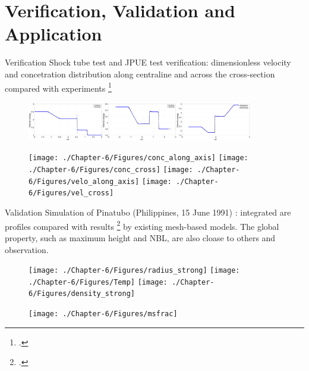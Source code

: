 \documentclass{beamer}
\begin{document}
\section{Verification, Validation and Application}
\begin{frame}{Verification}
Shock tube test and JPUE test verification: dimensionless velocity and concetration distribution along centraline and across the cross-section compared with experiments \footcite{papanicolaou1988investigations}
\begin{figure}
    \centering
	  \includegraphics[width=0.88\textwidth]{./PPT/Fig6} 
\end{figure}
\begin{figure}
\texttt{[image: ./Chapter-6/Figures/conc\_along\_axis]}
\hfill
\texttt{[image: ./Chapter-6/Figures/conc\_cross]}
\hfill
\texttt{[image: ./Chapter-6/Figures/velo\_along\_axis]}
\hfill
\texttt{[image: ./Chapter-6/Figures/vel\_cross]}
\end{figure}
\end{frame}

\begin{frame}{Validation}
Simulation of Pinatubo (Philippines, 15 June 1991) : integrated are profiles compared with results \footcite{costa2016results} by existing mesh-based models. The global property, such as maximum height and NBL, are also cloase to others and observation.
\begin{figure}
\flushleft
\texttt{[image: ./Chapter-6/Figures/radius\_strong]}
\hfill
\texttt{[image: ./Chapter-6/Figures/Temp]}
\hfill
\texttt{[image: ./Chapter-6/Figures/density\_strong]}
\end{figure}
\begin{figure}
\texttt{[image: ./Chapter-6/Figures/msfrac]}
\end{figure}
\end{frame}
\end{document}
